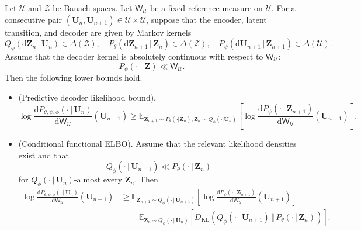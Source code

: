 \documentclass[11pt]{article}
\newcommand{\bbE}{\mathbb{E}}
\renewcommand{\d}{\mathrm{d}}
\begin{document}
\begin{proposition}
\label{prop:conditional_functional_elbo}
Let $\mathcal U$ and $\mathcal Z$ be Banach spaces. Let
$\mathsf W_{\mathcal U}$ be a fixed reference measure on $\mathcal U$. For a consecutive pair $(\mathbf U_n,\mathbf U_{n+1})\in\mathcal{U}\times\mathcal{U}$, suppose that the encoder, latent transition, and decoder are given by Markov kernels
\[
    Q_\phi(\d\mathbf Z_n\,|\, \mathbf U_n)\in\Delta(\mathcal{Z}),\quad
    P_\theta(\d\mathbf Z_{n+1}\,|\, \mathbf Z_n)\in\Delta(\mathcal{Z}),\quad
    P_\psi(\d\mathbf U_{n+1}\,|\, \mathbf Z_{n+1})\in\Delta(\mathcal{U}).
\]
Assume that the decoder kernel is absolutely continuous with respect to $\mathsf W_{\mathcal U}$:
\[
    P_\psi(\cdot\mid \mathbf Z)\ll \mathsf W_{\mathcal U}.
\]
Then the following lower bounds hold.
\begin{itemize}
\item[(a)] (Predictive decoder likelihood bound).
\begin{equation}
    \log \frac{\d P_{\theta,\psi,\phi}(\cdot\,|\,\mathbf{U}_n)}{\d\mathsf{W}_\mathcal{U}}(\mathbf{U}_{n+1})\geq\bbE_{\mathbf{Z}_{n+1}\sim P_\theta(\cdot|\mathbf{Z}_n),\mathbf{Z}_n\sim Q_\phi(\cdot|\mathbf{U}_n)}\left[\log \frac{\d P_\psi(\cdot\,|\,\mathbf{Z}_{n+1})}{\d\mathsf{W}_\mathcal{U}}(\mathbf{U}_{n+1})\right].\label{eq:predlb}
\end{equation}
\item[(b)] (Conditional functional ELBO). Assume that the relevant likelihood densities exist and that
\[
    Q_\phi(\cdot\,|\, \mathbf U_{n+1})
    \ll
    P_\theta(\cdot\,|\, \mathbf Z_n)
\]
for $Q_\phi(\cdot\,|\, \mathbf U_n)$-almost every $\mathbf Z_n$. Then
\[
\begin{aligned}
    \log \frac{\d P_{\theta,\psi,\phi}(\cdot\,|\,\mathbf{U}_n)}{\d\mathsf{W}_\mathcal{U}}(\mathbf{U}_{n+1})
    &\geq\mathbb{E}_{\mathbf Z_{n+1}\sim Q_\phi(\cdot\,|\, \mathbf U_{n+1})}
    \left[
        \log\frac{\d P_\psi(\cdot\,|\, \mathbf Z_{n+1})}{\d\mathsf{W}_\mathcal{U}}(\mathbf U_{n+1})
    \right]
    \\
    &\quad -\mathbb E_{\mathbf Z_n\sim Q_\phi(\cdot\,|\, \mathbf U_n)}
    \left[D_{\mathrm{KL}}\left(
    Q_\phi(\cdot\,|\, \mathbf U_{n+1})\,\Vert\,P_\theta(\cdot\,|\, \mathbf Z_n)
    \right)\right].
\end{aligned}
\]
\end{itemize}
\end{proposition}
\end{document}
